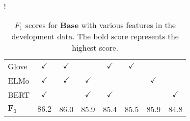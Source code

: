 \documentclass[letterpaper]{article} \usepackage{aaai20}  \usepackage{times}  \usepackage{helvet} \usepackage{courier}  \usepackage[hyphens]{url}  \usepackage{graphicx} \urlstyle{rm} \def\UrlFont{\rm}  \usepackage{graphicx}  \frenchspacing  \setlength{\pdfpagewidth}{8.5in}  \setlength{\pdfpageheight}{11in}  \usepackage{tabu}
\begin{document}
\begin{table}[t]
    \centering
\resizebox {0.8\columnwidth} {!} {
\small
    \begin{tabular}{|l|c|c|c|c|c|c|c|}
         \hline
         Glove              & $\checkmark$ & $\checkmark$ &              & $\checkmark$ & $\checkmark$ &              &              \\
         ELMo               & $\checkmark$ & $\checkmark$ & $\checkmark$ &              &              & $\checkmark$ &              \\
         BERT               & $\checkmark$ &              & $\checkmark$ & $\checkmark$ &              &              & $\checkmark$ \\
         \hline
         $\mathbf{F_{1}}$   & $\mathbf{86.2}$ & 86.0 & 85.9 & 85.4 & 85.5 & 85.9 & 84.8 \\
         \hline
    \end{tabular}
}
    \caption{$F_{1}$ scores for \textbf{Base} with various features in the development data. The bold score represents the highest score. \label{tb:eval:dev}}
\end{table}
\end{document}
